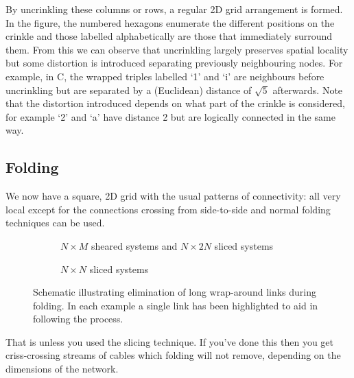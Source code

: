 			By uncrinkling these columns or rows, a regular 2D grid arrangement is
			formed. In the figure, the numbered hexagons enumerate the different
			positions on the crinkle and those labelled alphabetically are those that
			immediately surround them. From this we can observe that uncrinkling
			largely preserves spatial locality but some distortion is introduced
			separating previously neighbouring nodes. For example, in C, the wrapped
			triples labelled `1' and `i' are neighbours before uncrinkling but are
			separated by a (Euclidean) distance of $\sqrt{5}$ afterwards. Note that
			the distortion introduced depends on what part of the crinkle is
			considered, for example `2' and `a' have distance 2 but are logically
			connected in the same way.
		
		\subsection{Folding}
			
			We now have a square, 2D grid with the usual patterns of connectivity:
			all very local except for the connections crossing from side-to-side and
			normal folding techniques can be used.
			
			\begin{figure}
				\begin{subfigure}{\linewidth}
					\center
					\caption{$N \times M$ sheared systems and $N \times 2N$ sliced systems}
					\label{fig:folding-sheared}
				\end{subfigure}
				
				\vspace{1em}
				
				\begin{subfigure}{\linewidth}
					\center
					\caption{$N \times N$ sliced systems}
					\label{fig:foldingSliced}
				\end{subfigure}
				
				\caption{Schematic illustrating elimination of long wrap-around links
				during folding. In each example a single link has been highlighted to
				aid in following the process.}
				\label{fig:folding}
			\end{figure}
			
			That is unless you used the slicing technique. If you've done this then
			you get criss-crossing streams of cables which folding will not remove,
			depending on the dimensions of the network.
			
